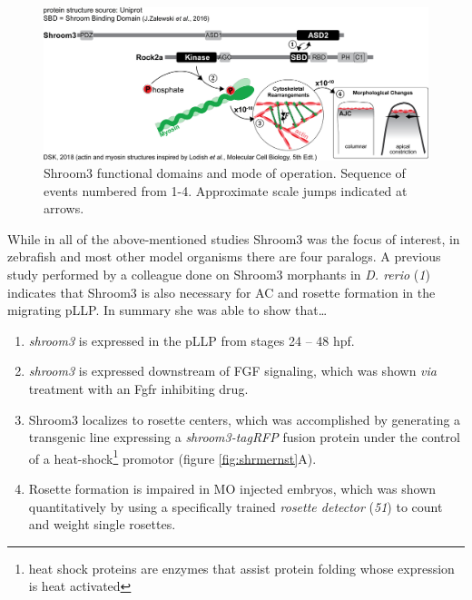 \documentclass[10pt, b5paper, singlespacinge, twoside]{reedthesis} %
\providecommand{\tightlist}{%
  \setlength{\itemsep}{0pt}\setlength{\parskip}{0pt}}
\theoremstyle{definition}
\theoremstyle{definition}
\theoremstyle{definition}
\theoremstyle{remark}
\begin{document}
\begin{figure}[H]

{\centering \includegraphics[width=0.95\linewidth]{figures/intro/shrm3_interaction} 

}

\caption[Shroom3 functional domains and mode of operation]{Shroom3 functional domains and mode of operation. Sequence of events numbered from 1-4. Approximate scale jumps indicated at arrows.}\label{fig:shrminteract}
\end{figure}
While in all of the above-mentioned studies Shroom3 was the focus of interest, in zebrafish and most other model organisms there are four paralogs. A previous study performed by a colleague done on Shroom3 morphants in \emph{D. rerio} (\emph{1}) indicates that Shroom3 is also necessary for AC and rosette formation in the migrating pLLP. In summary she was able to show that\ldots{}
\begin{enumerate}
\def\labelenumi{\arabic{enumi}.}
\tightlist
\item
  \emph{shroom3} is expressed in the pLLP from stages 24 -- 48 hpf.
\item
  \emph{shroom3} is expressed downstream of FGF signaling, which was shown \emph{via} treatment with an Fgfr inhibiting drug.
\item
  Shroom3 localizes to rosette centers, which was accomplished by generating a transgenic line expressing a \emph{shroom3-tagRFP} fusion protein under the control of a heat-shock\footnote{heat shock proteins are enzymes that assist protein folding whose expression is heat activated} promotor (figure \ref{fig:shrmernst}A).
\item
  Rosette formation is impaired in MO injected embryos, which was shown quantitatively by using a specifically trained \emph{rosette detector} (\emph{51}) to count and weight single rosettes.
\end{enumerate}
\end{document}
